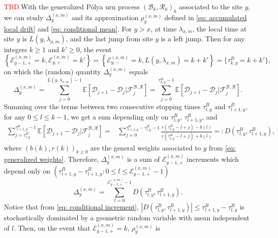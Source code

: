 \documentclass[twoside,12pt,a4paper]{article}
\numberwithin{equation}{section}
\newcommand{\abs}[1]{\left\vert #1 \right\vert}
\newcommand\TBD{\textcolor{red}{TBD.}}
\begin{document}
	\TBD With the generalized P\'{o}lya urn process $(\mathcal{B}_k,\mathcal{R}_k )_k$ associated to the site $y$, we can study $\Delta_{y}^{(x,m)}$ and its approximation $\rho_{y}^{(x,m)}$ defined in \eqref{eq: accumulated local drift} and \eqref{eq: conditional mean}. For $y>x $, at time $\lambda_{x,m}$, the local time at site $y$ is $L(y,\lambda_{x,m})$, and the last jump from site $y$ is a left jump. Then for any integers $k\geq 1$ and $k' \geq 0$, the event 
		$$\left\{ \mathcal{E}^{(x,m)}_{y-1,+} =k, \mathcal{E}^{(x,m)}_{y,+} = k'\right\} = \left\{\mathcal{E}^{(x,m)}_{y,-} =k,  L(y,\lambda_{x,m}) = k+k' \right\} = \{ \tau^B_{k,y} = k+k' \},$$ on which the (random) quantity $\Delta_{y}^{(x,m)}$ equals
		$$
		\Delta_{y}^{(x,m)} =\sum_{j=0}^{ L(y,\lambda_{x,m})-1} \mathbb{E}\left[ \mathcal{D}_{j+1} -\mathcal{D}_{j}  \vert \mathcal{F}^{\mathcal{B},\mathcal{R}}_{j} \right] = \sum_{j=0}^{\tau^B_{k,y}-1} \mathbb{E}\left[ \mathcal{D}_{j+1} -\mathcal{D}_{j}  \vert \mathcal{F}^{\mathcal{B},\mathcal{R}}_{j} \right].  
		$$ 
		Summing over the terms between two consecutive stopping times $\tau^{B}_{l,y} $ and $\tau^{B}_{l+1,y} $, for any $0\leq l \leq k -1$,  we get a sum depending only on $\tau^{B}_{l,y} $, $\tau^{B}_{l+1,y} $, and 
		\begin{align} \label{eq: conditional increment}
		 	\sum_{j=\tau^{B}_{l,y}}^{\tau^B_{l+1,y}-1} \mathbb{E}\left[ \mathcal{D}_{j+1} - \mathcal{D}_{j}  \vert \mathcal{F}^{\mathcal{B},\mathcal{R}}_{j} \right] =&
		 	 \sum_{j=0}^{\tau^B_{l+1,y}-\tau^{B}_{l,y}-1} \frac{ r(\tau^{B}_{l,y}-l + j) - b(l)  }{ r(\tau^{B}_{l,y}-l + j) + b(l)  } 
		 	 =:  D(\tau^{B}_{l,y},\tau^{B}_{l+1,y} ),
		\end{align}   
		where $(b(k),r(k))_{k\geq 0}$ are the general weights associated to $y$ from \eqref{eq: generalized weights}.
		Therefore,  $\Delta_{y}^{(x,m)}$ is a sum of $\mathcal{E}^{(x,m)}_{y-1,+} $ increments which depend only on $ \left(\tau^{B}_{l+1,y} - \tau^{B}_{l+1,y}: 0\leq l\leq   \mathcal{E}^{(x,m)}_{y-1,+}-1 \right) $
				\begin{equation} \label{eq: cummulated drift at a site}
					\Delta_{y}^{(x,m)} = \sum_{l=0 }^{ \mathcal{E}^{(x,m)}_{y-1,+} -1  } D(\tau^{B}_{l,y},\tau^{B}_{l+1,y} ).
				\end{equation}			
		Notice that from \eqref{eq: conditional increment}, $\abs{  D(\tau^{B}_{l,y},\tau^{B}_{l+1,y} )} \leq  \tau^{B}_{l+1,y}-\tau^{B}_{l,y}$ is stochastically dominated by a geometric random variable with mean independent of $l$. 
		Then, on the event that $ \mathcal{E}^{(x,m)}_{y-1,+} = k $, $ \rho_{y}^{(x,m)} $ is
\end{document}
